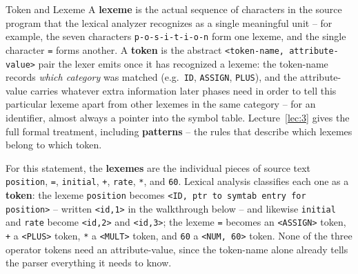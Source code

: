 \documentclass[full-course-notes.tex]{subfiles}
\begin{document}
\begin{defbox}{Token and Lexeme}
A \textbf{lexeme} is the actual sequence of characters in the source program that the lexical
analyzer recognizes as a single meaningful unit -- for example, the seven characters
\texttt{p-o-s-i-t-i-o-n} form one lexeme, and the single character \texttt{=} forms another. A
\textbf{token} is the abstract \texttt{<token-name, attribute-value>} pair the lexer emits once
it has recognized a lexeme: the token-name records \emph{which category} was matched (e.g.\
\texttt{ID}, \texttt{ASSIGN}, \texttt{PLUS}), and the attribute-value carries whatever extra
information later phases need in order to tell this particular lexeme apart from other lexemes
in the same category -- for an identifier, almost always a pointer into the symbol table.
Lecture~\ref{lec:3} gives the full formal treatment, including \textbf{patterns} -- the rules
that describe which lexemes belong to which token.
\end{defbox}

For this statement, the \textbf{lexemes} are the individual pieces of source text
\texttt{position}, \texttt{=}, \texttt{initial}, \texttt{+}, \texttt{rate}, \texttt{*}, and
\texttt{60}. Lexical analysis classifies each one as a \textbf{token}: the lexeme
\texttt{position} becomes \texttt{<ID, ptr to symtab entry for \texttt{position}>} -- written
\texttt{<id,1>} in the walkthrough below -- and likewise \texttt{initial} and \texttt{rate}
become \texttt{<id,2>} and \texttt{<id,3>}; the lexeme \texttt{=} becomes an
\texttt{<ASSIGN>} token, \texttt{+} a \texttt{<PLUS>} token, \texttt{*} a \texttt{<MULT>} token,
and \texttt{60} a \texttt{<NUM, 60>} token. None of the three operator tokens need an
attribute-value, since the token-name alone already tells the parser everything it needs to
know.
\end{document}
